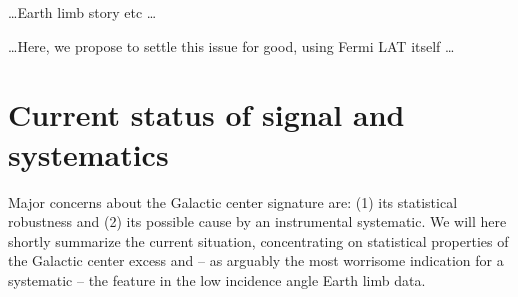 \documentclass[aps,prd,superscriptaddress,nofootinbib,fixlfloat, 12pt]{revtex4-1}
\newcommand{\Fermi}{{\slshape Fermi}}
\begin{document}

 

\dots Earth limb story etc \dots

\dots Here, we propose to settle this issue for good, using Fermi LAT itself
\dots

\section{Current status of signal and systematics}
Major concerns about the Galactic center signature are: (1) its statistical
robustness and (2) its possible cause by an instrumental systematic. We will
here shortly summarize the current situation, concentrating on statistical
properties of the Galactic center excess and -- as arguably the most worrisome
indication for a systematic -- the feature in the low incidence angle Earth
limb data.
\end{document}
